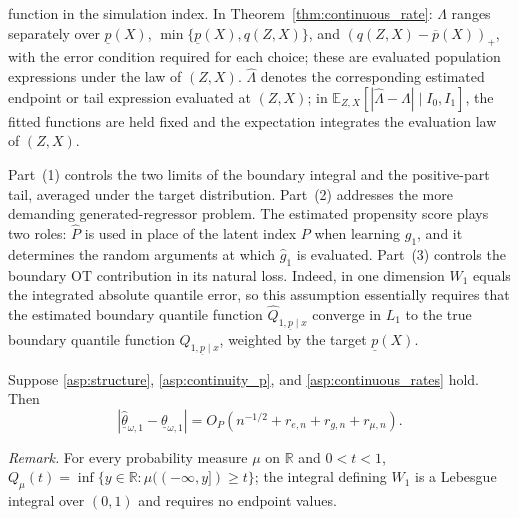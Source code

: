function in the simulation index. In Theorem~\ref{thm:continuous_rate}: $\Lambda$ ranges separately over $\underline p(X)$, $\min\{\underline p(X),q(Z,X)\}$, and $(q(Z,X)-\overline p(X))_+$, with the error condition required for each choice; these are evaluated population expressions under the law of $(Z,X)$. $\hat\Lambda$ denotes the corresponding estimated endpoint or tail expression evaluated at $(Z,X)$; in $\mathbb E_{Z,X}[|\hat\Lambda-\Lambda|\mid I_0,I_1]$, the fitted functions are held fixed and the expectation integrates the evaluation law of $(Z,X)$.


Part~(1) controls the two limits of the boundary integral and the positive-part tail, averaged under the target distribution. Part~(2) addresses the more demanding generated-regressor problem. The estimated propensity score plays two roles: $\hat P$ is used in place of the latent index $P$ when learning $g_1$, and it determines the random arguments at which $\hat g_1$ is evaluated. Part~(3) controls the boundary OT contribution in its natural loss. Indeed, in one dimension $W_1$ equals the integrated absolute quantile error, so this assumption essentially requires that the estimated boundary quantile function $\widehat Q_{1,\underline p\mid x}$ converge in $L_1$ to the true boundary quantile function $Q_{1,\underline p\mid x}$, weighted by the target $\underline{p}(X)$.

\begin{theorem}\label{thm:continuous_rate}
    Suppose \cref{asp:structure}, \cref{asp:continuity_p}, and \cref{asp:continuous_rates} hold. Then
    \[
        |\hat{\underline\theta}_{\omega,1}-\underline\theta_{\omega,1}|
        =O_P\!\left(n^{-1/2}+r_{e,n}+r_{g,n}+r_{\mu,n}\right).
    \]
\end{theorem}

\noindent\textit{Remark.} For every probability measure $\mu$ on $\mathbb R$ and $0<t<1$, $Q_\mu(t)=\inf\{y\in\mathbb R:\mu(( -\infty,y])\geqslant t\}$; the integral defining $W_1$ is a Lebesgue integral over $(0,1)$ and requires no endpoint values.



